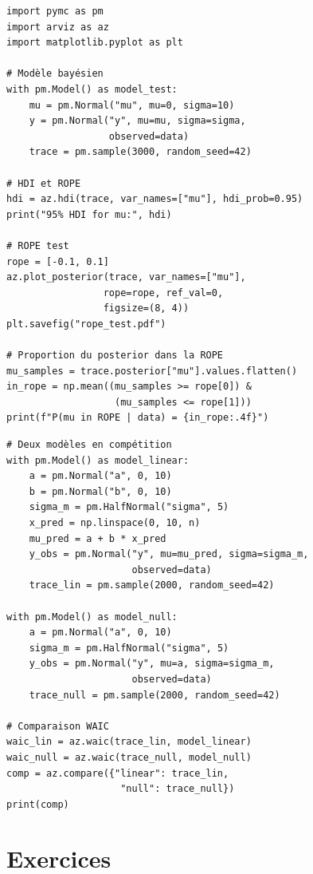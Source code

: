 \begin{codeblock}[title=\textbf{ROPE et HDI avec PyMC}]
\begin{verbatim}
import pymc as pm
import arviz as az
import matplotlib.pyplot as plt

# Modèle bayésien
with pm.Model() as model_test:
    mu = pm.Normal("mu", mu=0, sigma=10)
    y = pm.Normal("y", mu=mu, sigma=sigma,
                  observed=data)
    trace = pm.sample(3000, random_seed=42)

# HDI et ROPE
hdi = az.hdi(trace, var_names=["mu"], hdi_prob=0.95)
print("95% HDI for mu:", hdi)

# ROPE test
rope = [-0.1, 0.1]
az.plot_posterior(trace, var_names=["mu"],
                 rope=rope, ref_val=0,
                 figsize=(8, 4))
plt.savefig("rope_test.pdf")

# Proportion du posterior dans la ROPE
mu_samples = trace.posterior["mu"].values.flatten()
in_rope = np.mean((mu_samples >= rope[0]) &
                   (mu_samples <= rope[1]))
print(f"P(mu in ROPE | data) = {in_rope:.4f}")
\end{verbatim}
\end{codeblock}

\begin{codeblock}[title=\textbf{Comparaison de mod\`eles avec WAIC}]
\begin{verbatim}
# Deux modèles en compétition
with pm.Model() as model_linear:
    a = pm.Normal("a", 0, 10)
    b = pm.Normal("b", 0, 10)
    sigma_m = pm.HalfNormal("sigma", 5)
    x_pred = np.linspace(0, 10, n)
    mu_pred = a + b * x_pred
    y_obs = pm.Normal("y", mu=mu_pred, sigma=sigma_m,
                      observed=data)
    trace_lin = pm.sample(2000, random_seed=42)

with pm.Model() as model_null:
    a = pm.Normal("a", 0, 10)
    sigma_m = pm.HalfNormal("sigma", 5)
    y_obs = pm.Normal("y", mu=a, sigma=sigma_m,
                      observed=data)
    trace_null = pm.sample(2000, random_seed=42)

# Comparaison WAIC
waic_lin = az.waic(trace_lin, model_linear)
waic_null = az.waic(trace_null, model_null)
comp = az.compare({"linear": trace_lin,
                    "null": trace_null})
print(comp)
\end{verbatim}
\end{codeblock}

\section{Exercices}

